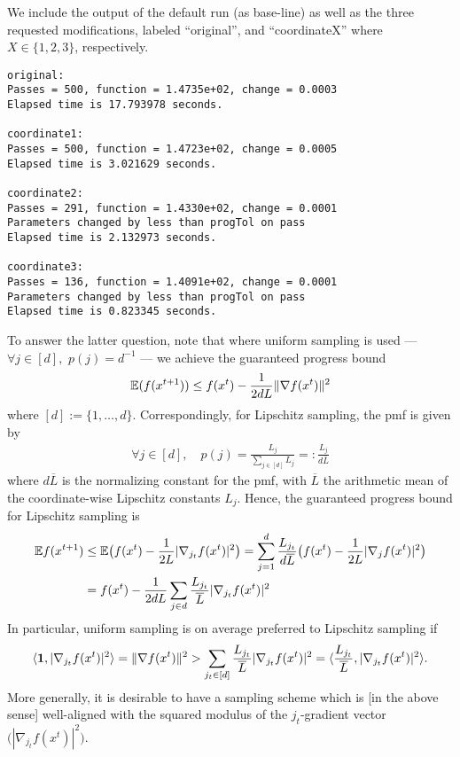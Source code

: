 \documentclass{article}
\begin{document}
We include the output of the default run (as base-line) as well as the three
requested modifications, labeled ``original'', and ``coordinateX'' where $X \in
\{1,2,3\}$, respectively. 
\begin{verbatim}
original: 
Passes = 500, function = 1.4735e+02, change = 0.0003 
Elapsed time is 17.793978 seconds.

coordinate1: 
Passes = 500, function = 1.4723e+02, change = 0.0005 
Elapsed time is 3.021629 seconds.

coordinate2: 
Passes = 291, function = 1.4330e+02, change = 0.0001 
Parameters changed by less than progTol on pass 
Elapsed time is 2.132973 seconds.

coordinate3: 
Passes = 136, function = 1.4091e+02, change = 0.0001 
Parameters changed by less than progTol on pass 
Elapsed time is 0.823345 seconds.
\end{verbatim}
To answer the latter question, note that where uniform sampling is used ---
$\forall j \in [d], \,\, p(j) =
d^{-1}$ --- we achieve the guaranteed progress bound
\begin{align*}
  \mathbb E (f(x^{t+1})) \leq f(x^t) - \frac{1}{2dL} \|\nabla f(x^t)\|^2
\end{align*}
where $[d] := \{1, \ldots, d\}$. Correspondingly, for Lipschitz sampling, the
pmf is given by
\begin{align*}
\forall j \in [d],\quad p(j) = \frac{L_j}{\sum_{j \in [d]} L_j} =: \frac{L_j}{d \overline{L}}
\end{align*}
where $d\overline{L}$ is the normalizing constant for the pmf, with
$\overline{L}$ the arithmetic mean of the coordinate-wise Lipschitz constants
$L_j$. Hence, the guaranteed progress bound for Lipschitz sampling is
\begin{align*}
  \E f(x^{t+1}) &\leq \E \big( f(x^t) - \frac{1}{2L} |\nabla_{j_t}
                  f(x^t)|^2\big) %
                  = \sum_{j=1}^d \frac{L_{j_t}}{d\overline{L}} \big( f(x^t) - \frac{1}{2L} |\nabla_j
                  f(x^t)|^2 \big) %
  \\
                &= f(x^t) - \frac{1}{2d L} \sum_{j\in d} \frac{L_{j_t}}{\overline{L}} |\nabla_{j_t} f(x^t)|^2
\end{align*}
In particular, uniform sampling is on average preferred to Lipschitz sampling
if
\begin{align*}
\langle \mathbf{1}, |\nabla_{j_t} f(x^t)|^2\rangle = \|\nabla f(x^t)\|^2 > \sum_{j_t\in [d]} \frac{L_{j_t}}{\overline{L}}
|\nabla_{j_t} f(x^t)|^2 = \langle \frac{L_{j_t}}{\overline{L}}, |\nabla_{j_t} f(x^t)|^2\rangle.
\end{align*}
More generally, it is desirable to have a sampling scheme which is [in the
above sense] well-aligned with the squared modulus of the $j_t$-gradient vector
$\big(|\nabla_{j_t} f(x^t)|^2 \big)$.
\end{document}
